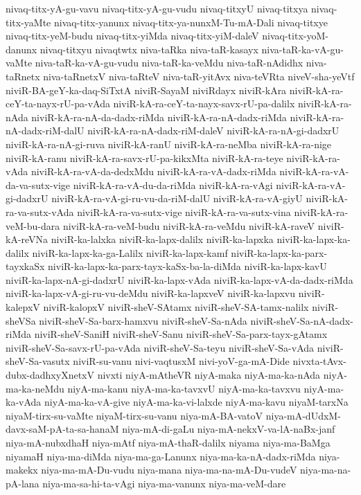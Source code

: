 {nivaq-titx-yA-gu-vavu
nivaq-titx-yA-gu-vudu
nivaq-titxyU
nivaq-titxya
nivaq-titx-yaMte
nivaq-titx-yanunx
nivaq-titx-ya-nunxM-Tu-mA-Dali
nivaq-titxye
nivaq-titx-yeM-budu
nivaq-titx-yiMda
nivaq-titx-yiM-daleV
nivaq-titx-yoM-danunx
nivaq-titxyu
nivaqtwtx
niva-taRka
niva-taR-kasayx
niva-taR-ka-vA-gu-vaMte
niva-taR-ka-vA-gu-vudu
niva-taR-ka-veMdu
niva-taR-nAdidhx
niva-taRnetx
niva-taRnetxV
niva-taRteV
niva-taR-yitAvx
niva-teVRta
niveV-sha-yeVtf
niviR-BA-geY-ka-daq-SiTxtA
niviR-SayaM
niviRdayx
niviR-kAra
niviR-kA-ra-ceY-ta-nayx-rU-pa-vAda
niviR-kA-ra-ceY-ta-nayx-savx-rU-pa-dalilx
niviR-kA-ra-nAda
niviR-kA-ra-nA-da-dadx-riMda
niviR-kA-ra-nA-dadx-riMda
niviR-kA-ra-nA-dadx-riM-dalU
niviR-kA-ra-nA-dadx-riM-daleV
niviR-kA-ra-nA-gi-dadxrU
niviR-kA-ra-nA-gi-ruva
niviR-kA-ranU
niviR-kA-ra-neMba
niviR-kA-ra-nige
niviR-kA-ranu
niviR-kA-ra-savx-rU-pa-kikxMta
niviR-kA-ra-teye
niviR-kA-ra-vAda
niviR-kA-ra-vA-da-dedxMdu
niviR-kA-ra-vA-dadx-riMda
niviR-kA-ra-vA-da-va-sutx-vige
niviR-kA-ra-vA-du-da-riMda
niviR-kA-ra-vAgi
niviR-kA-ra-vA-gi-dadxrU
niviR-kA-ra-vA-gi-ru-vu-da-riM-dalU
niviR-kA-ra-vA-giyU
niviR-kA-ra-va-sutx-vAda
niviR-kA-ra-va-sutx-vige
niviR-kA-ra-va-sutx-vina
niviR-kA-ra-veM-bu-dara
niviR-kA-ra-veM-budu
niviR-kA-ra-veMdu
niviR-kA-raveV
niviR-kA-reVNa
niviR-ka-lalxka
niviR-ka-lapx-dalilx
niviR-ka-lapxka
niviR-ka-lapx-ka-dalilx
niviR-ka-lapx-ka-ga-Lalilx
niviR-ka-lapx-kamf
niviR-ka-lapx-ka-parx-tayxkaSx
niviR-ka-lapx-ka-parx-tayx-kaSx-ba-la-diMda
niviR-ka-lapx-kavU
niviR-ka-lapx-nA-gi-dadxrU
niviR-ka-lapx-vAda
niviR-ka-lapx-vA-da-dadx-riMda
niviR-ka-lapx-vA-gi-ru-vu-deMdu
niviR-ka-lapxveV
niviR-ka-lapxvu
niviR-kalepxV
niviR-kalopxV
niviR-sheV-SAtamx
niviR-sheV-SA-tamx-nalilx
niviR-sheVSa
niviR-sheV-Sa-barx-hamxvu
niviR-sheV-Sa-nAda
niviR-sheV-Sa-nA-dadx-riMda
niviR-sheV-SaniH
niviR-sheV-Sanu
niviR-sheV-Sa-parx-tayx-gAtamx
niviR-sheV-Sa-savx-rU-pa-vAda
niviR-sheV-Sa-teyu
niviR-sheV-Sa-vAda
niviR-sheV-Sa-vasutx
niviR-su-vanu
nivi-vaqtusxM
nivi-yoV-ga-mA-Dide
nivxta-tAvx-dubx-dadhxyXnetxV
nivxti
niyA-mAtheVR
niyA-maka
niyA-ma-ka-nAda
niyA-ma-ka-neMdu
niyA-ma-kanu
niyA-ma-ka-tavxvU
niyA-ma-ka-tavxvu
niyA-ma-ka-vAda
niyA-ma-ka-vA-give
niyA-ma-ka-vi-lalxde
niyA-ma-kavu
niyaM-tarxNa
niyaM-tirx-su-vaMte
niyaM-tirx-su-vanu
niya-mA-BA-vatoV
niya-mA-dUdxM-davx-saM-pA-ta-sa-hanaM
niya-mA-di-gaLu
niya-mA-nekxV-va-lA-naBx-janf
niya-mA-nubxdhaH
niya-mAtf
niya-mA-thaR-dalilx
niyama
niya-ma-BaMga
niyamaH
niya-ma-diMda
niya-ma-ga-Lanunx
niya-ma-ka-nA-dadx-riMda
niya-makekx
niya-ma-mA-Du-vudu
niya-mana
niya-ma-na-mA-Du-vudeV
niya-ma-na-pA-lana
niya-ma-sa-hi-ta-vAgi
niya-ma-vanunx
niya-ma-veM-dare
}
